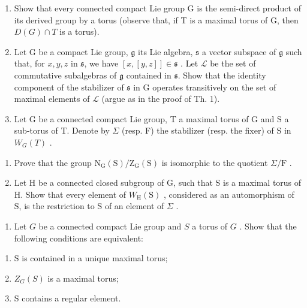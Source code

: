 \begin{enumerate}
\def\labelenumi{\arabic{enumi})}
\setcounter{enumi}{1}
\item
  Show that every connected compact Lie group G is the semi-direct product of its derived group by a torus (observe that, if T is a maximal torus of G, then \(D(G) \cap T\) is a torus).
\item
  Let G be a compact Lie group, \(\mathfrak{g}\) its Lie algebra, \(\mathfrak{s}\) a vector subspace of \(\mathfrak{g}\) such that, for \(x, y, z\) in \(\mathfrak{s}\), we have \([x, [y, z]] \in \mathfrak{s}\) . Let \(\mathcal{L}\) be the set of commutative subalgebras of \(\mathfrak{g}\) contained in \(\mathfrak{s}\). Show that the identity component of the stabilizer of \(\mathfrak{s}\) in G operates transitively on the set of maximal elements of \(\mathcal{L}\) (argue as in the proof of Th. 1).
\item
  Let G be a connected compact Lie group, T a maximal torus of G and S a sub-torus of T. Denote by \(\Sigma\) (resp. F) the stabilizer (resp. the fixer) of S in \(W_{G}(T)\) .
\end{enumerate}

\begin{enumerate}
\def\labelenumi{\alph{enumi})}
\item
  Prove that the group \(\mathrm{N_G(S) / Z_G(S)}\) is isomorphic to the quotient \(\Sigma /\mathrm{F}\) .
\item
  Let H be a connected closed subgroup of G, such that S is a maximal torus of H. Show that every element of \(W_{\mathrm{H}}(\mathrm{S})\) , considered as an automorphism of S, is the restriction to S of an element of \(\Sigma\) .
\end{enumerate}

\begin{enumerate}
\def\labelenumi{\arabic{enumi})}
\setcounter{enumi}{4}
\tightlist
\item
  Let \(G\) be a connected compact Lie group and \(S\) a torus of \(G\) . Show that the following conditions are equivalent:
\end{enumerate}

\begin{enumerate}
\def\labelenumi{(\roman{enumi})}
\item
  S is contained in a unique maximal torus;
\item
  \(Z_{G}(S)\) is a maximal torus;
\item
  S contains a regular element.
\end{enumerate}


